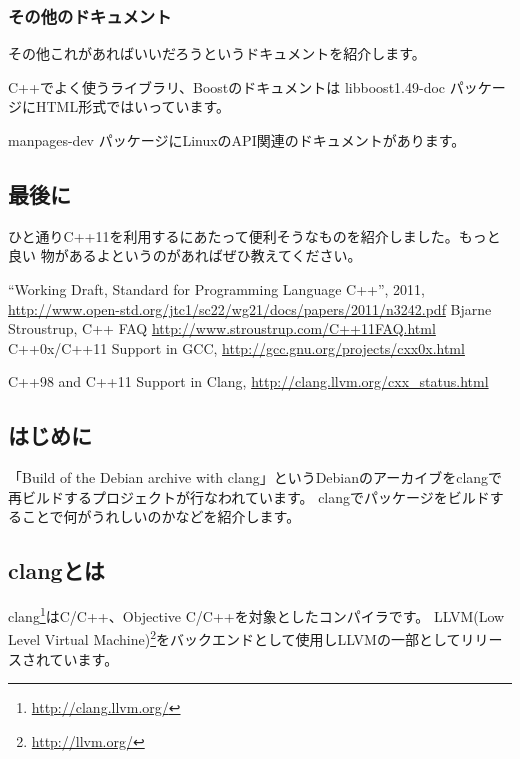 \documentclass[mingoth,a4paper]{jsarticle}
\begin{document}
\subsubsection{その他のドキュメント}

その他これがあればいいだろうというドキュメントを紹介します。

C++でよく使うライブラリ、Boostのドキュメントは libboost1.49-doc パッケージにHTML形式ではいっています。

manpages-dev パッケージにLinuxのAPI関連のドキュメントがあります。

\subsection{最後に}

ひと通りC++11を利用するにあたって便利そうなものを紹介しました。もっと良い
物があるよというのがあればぜひ教えてください。

\begin{thebibliography}{98}
 ``Working Draft, Standard for Programming Language
	C++'', 2011,
	\url{http://www.open-std.org/jtc1/sc22/wg21/docs/papers/2011/n3242.pdf}
	Bjarne Stroustrup, C++ FAQ
	\url{http://www.stroustrup.com/C++11FAQ.html}
	C++0x/C++11 Support in GCC, 
	\url{http://gcc.gnu.org/projects/cxx0x.html}

	C++98 and C++11 Support in Clang, \url{http://clang.llvm.org/cxx_status.html}
\end{thebibliography}

\subsection{はじめに}
「Build of the Debian archive with clang」\cite{clangdebiannet}というDebianのアーカイブをclangで再ビルドするプロジェクトが行なわれています。
clangでパッケージをビルドすることで何がうれしいのかなどを紹介します。

\subsection{clangとは}
clang\footnote{\url{http://clang.llvm.org/}}はC/C++、Objective C/C++を対象としたコンパイラです。
LLVM(Low Level Virtual Machine)\footnote{\url{http://llvm.org/}}をバックエンドとして使用しLLVMの一部としてリリースされています。
\end{document}
